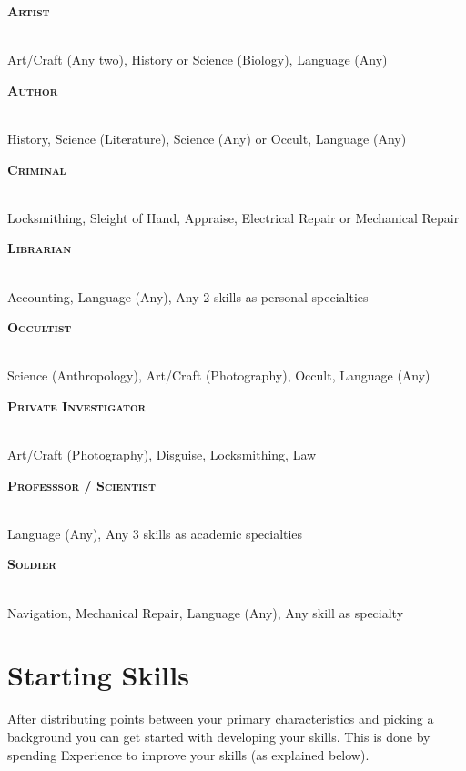 
\newcommand{\makebackground}[3]{
    \noindent
    \begin{minipage}{\linewidth}
        {\raggedright\normalfont\large\bfseries\scshape #1}\\
        #3
    \end{minipage}
    \par
}
\vspace{\parskip}
\begin{multicols}{2}
    \makebackground{Artist}{}
    {Art/Craft (Any two), History or Science (Biology), Language (Any)}

    \makebackground{Author}{}
    {History, Science (Literature), Science (Any) or Occult, Language (Any)}

    \makebackground{Criminal}{}
    {Locksmithing, Sleight of Hand, Appraise, Electrical Repair or Mechanical Repair}

    \makebackground{Librarian}{}
    {Accounting, Language (Any), Any 2 skills as personal specialties}

    \makebackground{Occultist}{}
    {Science (Anthropology), Art/Craft (Photography), Occult, Language (Any)}
   
    \makebackground{Private Investigator}{}
    {Art/Craft (Photography), Disguise, Locksmithing, Law}

    \makebackground{Professsor / Scientist}{}
    {Language (Any), Any 3 skills as academic specialties}

    \makebackground{Soldier}{}
    {Navigation, Mechanical Repair, Language (Any), Any skill as specialty}

\end{multicols}



\section{Starting Skills}
After distributing points between your primary characteristics and picking a background
you can get started with developing your skills. This is done by spending Experience to improve your skills (as explained below). 

